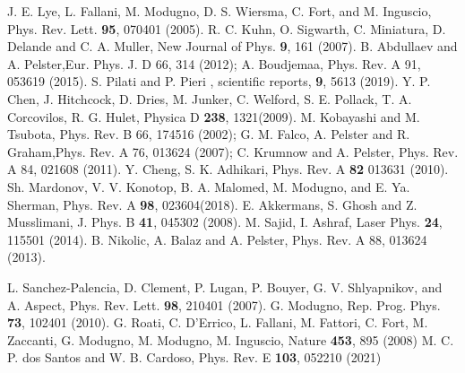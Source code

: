 \documentclass[amsmath,amssymb,lengthcheck,aps,prl] {revtex4}
\begin{document}
\begin{thebibliography}{50}
 J. E. Lye, L. Fallani, M. Modugno, D. S. Wiersma, C. Fort, and M. Inguscio, Phys. Rev. Lett. {\bf 95}, 070401 (2005). %
 R. C. Kuhn, O. Sigwarth, C. Miniatura, D. Delande and C. A. Muller, New Journal of Phys. {\bf 9}, 161 (2007). 
 B. Abdullaev and A. Pelster,Eur. Phys. J. D 66, 314 (2012); A. Boudjemaa, Phys. Rev. A 91,
053619 (2015).
 S. Pilati and P. Pieri , scientific reports, {\bf 9}, 5613 (2019).%
 Y. P. Chen, J. Hitchcock, D. Dries, M. Junker, C. Welford, S. E. Pollack, T. A. Corcovilos, R. G. Hulet, Physica D {\bf 238}, 1321(2009).
 M. Kobayashi and M. Tsubota, Phys. Rev. B 66, 174516 (2002); G. M. Falco, A. Pelster and R. Graham,Phys. Rev. A 76, 013624 (2007); C. Krumnow and A. Pelster, Phys.
Rev. A 84, 021608 (2011).
 Y. Cheng, S. K. Adhikari, Phys. Rev. A {\bf 82} 013631 (2010).
 Sh. Mardonov, V. V. Konotop, B. A. Malomed, M. Modugno, and E. Ya. Sherman, Phys. Rev. A {\bf 98}, 023604(2018).%
 E. Akkermans, S. Ghosh and Z. Musslimani, J. Phys. B {\bf 41}, 045302 (2008). %
 M. Sajid, I. Ashraf, Laser Phys. {\bf 24}, 115501 (2014). %
 B. Nikolic, A. Balaz and A. Pelster, Phys. Rev. A 88, 013624 (2013).


 L. Sanchez-Palencia, D. Clement, P. Lugan, P. Bouyer, G. V. Shlyapnikov, and A. Aspect, Phys. Rev. Lett. {\bf 98}, 210401 (2007).
 G. Modugno, Rep. Prog. Phys. {\bf 73}, 102401 (2010). %
 G. Roati, C. D'Errico, L. Fallani, M. Fattori, C. Fort, M. Zaccanti, G. Modugno, M. Modugno, M. Inguscio, Nature {\bf 453}, 895 (2008) %
 M. C. P. dos Santos and W. B. Cardoso, Phys. Rev. E {\bf 103}, 052210 (2021)




\end{thebibliography}
\end{document}
